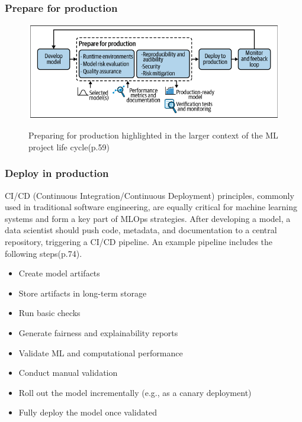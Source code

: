 \subsubsection{Prepare for production}

\begin{figure}[!htbp]
    \caption{Preparing for production highlighted in the larger context of the ML project
    life cycle\cite{treveil2020introducing}(p.59)}
    \centering
    \includegraphics[scale=0.5]{images/prep-prod-intro}
    \label{fig:prep-prod-intro}
\end{figure}


\subsubsection{Deploy in production}

CI/CD (Continuous Integration/Continuous Deployment) principles, commonly used in traditional software engineering, are equally critical for machine learning systems and form a key part of MLOps strategies.
After developing a model, a data scientist should push code, metadata, and documentation to a central repository, triggering a CI/CD pipeline.
An example pipeline includes the following steps\cite{treveil2020introducing}(p.74).

\begin{itemize}
    \item Create model artifacts
    \item Store artifacts in long-term storage
    \item Run basic checks
    \item Generate fairness and explainability reports
\end{itemize}
\begin{itemize}
    \item Validate ML and computational performance
    \item Conduct manual validation
\end{itemize}
\begin{itemize}
    \item Roll out the model incrementally (e.g., as a canary deployment)
    \item Fully deploy the model once validated
\end{itemize}

